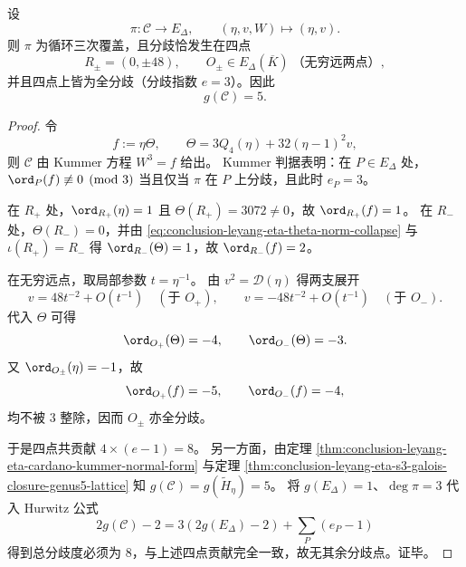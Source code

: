 \begin{theorem}\label{thm:conclusion-leyang-eta-kummer-cover-ramification-genus}
设
\[
\pi:\mathcal C\longrightarrow E_\Delta,\qquad
(\eta,v,W)\longmapsto(\eta,v).
\]
则 \(\pi\) 为循环三次覆盖，且分歧恰发生在四点
\[
R_\pm=(0,\pm48),\qquad O_\pm\in E_\Delta(\overline K)\ \text{（无穷远两点）},
\]
并且四点上皆为全分歧（分歧指数 \(e=3\)）。因此
\[
g(\mathcal C)=5.
\]
\end{theorem}
\begin{proof}
令
\[
f:=\eta\Theta,\qquad
\Theta=3Q_4(\eta)+32(\eta-1)^2v,
\]
则 \(\mathcal C\) 由 Kummer 方程 \(W^3=f\) 给出。
Kummer 判据表明：在 \(P\in E_\Delta\) 处，
\(
\ord_P(f)\not\equiv 0\pmod3
\)
当且仅当 \(\pi\) 在 \(P\) 上分歧，且此时 \(e_P=3\)。

在 \(R_+\) 处，\(\ord_{R_+}(\eta)=1\) 且
\(\Theta(R_+)=3072\neq0\)，故 \(\ord_{R_+}(f)=1\)。
在 \(R_-\) 处，\(\Theta(R_-)=0\)，并由
\eqref{eq:conclusion-leyang-eta-theta-norm-collapse}
与 \(\iota(R_+)=R_-\) 得 \(\ord_{R_-}(\Theta)=1\)，故
\(\ord_{R_-}(f)=2\)。

在无穷远点，取局部参数 \(t=\eta^{-1}\)。
由 \(v^2=\mathscr D(\eta)\) 得两支展开
\[
v=48t^{-2}+O(t^{-1})\quad(\text{于 }O_+),\qquad
v=-48t^{-2}+O(t^{-1})\quad(\text{于 }O_-).
\]
代入 \(\Theta\) 可得
\[
\ord_{O_+}(\Theta)=-4,\qquad
\ord_{O_-}(\Theta)=-3.
\]
又 \(\ord_{O_\pm}(\eta)=-1\)，故
\[
\ord_{O_+}(f)=-5,\qquad
\ord_{O_-}(f)=-4,
\]
均不被 \(3\) 整除，因而 \(O_\pm\) 亦全分歧。

于是四点共贡献
\(
4\times(e-1)=8
\)。
另一方面，由定理
\ref{thm:conclusion-leyang-eta-cardano-kummer-normal-form}
与定理
\ref{thm:conclusion-leyang-eta-s3-galois-closure-genus5-lattice}
知 \(g(\mathcal C)=g(\widetilde H_\eta)=5\)。
将 \(g(E_\Delta)=1\)、\(\deg\pi=3\) 代入 Hurwitz 公式
\[
2g(\mathcal C)-2=3(2g(E_\Delta)-2)+\sum_{P}(e_P-1)
\]
得到总分歧度必须为 \(8\)，与上述四点贡献完全一致，故无其余分歧点。证毕。
\end{proof}

